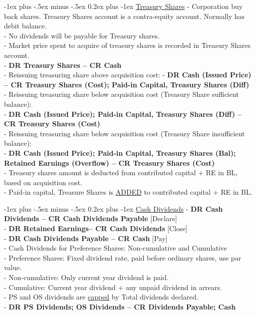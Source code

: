 \documentclass[10pt,landscape]{article}
\makeatletter
\renewcommand{\subsubsection}{\@startsection{subsubsection}{3}{0mm}%
                                {-1ex plus -.5ex minus -.5ex}%
                                {0.2ex plus -1ex}%
                                {\normalfont\footnotesize\bfseries}}
\makeatother
\begin{document}
\begin{multicols}{3}
\begin{scriptsize}
\subsubsection{\underline{Treasury Shares}}
- Corporation buy back shares. Treasury Shares account is a contra-equity account. Normally has debit balance.\\
- No dividends will be payable for Treasury shares.\\
- Market price spent to acquire of treasury shares is recorded in Treasury Shares account.\\
- \textbf{DR Treasury Shares -- CR Cash}\\
- Reissuing treasuring share above acquisition cost:
- \textbf{DR Cash (Issued Price) -- CR Treasury Shares (Cost); Paid-in Capital, Treasury Shares (Diff)}\\
- Reissuing treasuring share below acquisition cost (Treasury Share sufficient balance):\\
- \textbf{DR Cash (Issued Price); Paid-in Capital, Treasury Shares (Diff) -- CR Treasury Shares (Cost)}\\
- Reissuing treasuring share below acquisition cost (Treasury Share insufficient balance):\\
- \textbf{DR Cash (Issued Price); Paid-in Capital, Treasury Shares (Bal); Retained Earnings (Overflow) -- CR Treasury Shares (Cost)}\\
- Treasury shares amount is deducted from contributed capital + RE in BL, based on acquisition cost.\\
- Paid-in capital, Treasure Shares is \underline{ADDED} to contributed capital + RE in BL.

\subsubsection{\underline{Cash Dividends}}
- \textbf{DR Cash Dividends -- CR Cash Dividends Payable} [Declare]\\
- \textbf{DR Retained Earnings-- CR Cash Dividends} [Close]\\
- \textbf{DR Cash Dividends Payable -- CR Cash} [Pay]\\
- Cash Dividends for Preference Shares: Non-cumulative and Cumulative\\
- Preference Shares: Fixed dividend rate, paid before ordinary shares, use par value.\\
- Non-cumulative: Only current year dividend is paid.\\
- Cumulative: Current year dividend + any unpaid dividend in arrears.\\
- PS and OS dividends are \underline{capped} by Total dividends declared.\\
- \textbf{DR PS Dividends; OS Dividends -- CR Dividends Payable; Cash}\\


\end{scriptsize}
\end{multicols}
\end{document}
